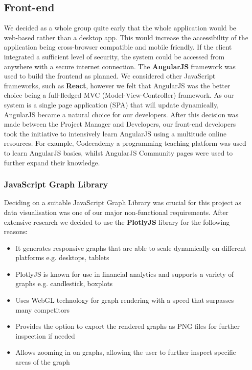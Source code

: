 \documentclass[12pt]{article}
\begin{document}
  \subsection{Front-end}
  We decided as a whole group quite early that the whole application would be web-based rather than a desktop app. This would
  increase the accessibility of the application being cross-browser compatible and mobile friendly. If the client integrated a sufficient
  level of security, the system could be accessed from anywhere with a secure internet connection.\newline
  The \textbf{AngularJS} framework was used to build the frontend as planned. We considered other JavaScript frameworks,
  such as \textbf{React}, however we felt that AngularJS was the better choice being a full-fledged MVC (Model-View-Controller) framework.
  As our system is a single page application (SPA) that will update dynamically, AngularJS became a natural choice for our developers.
  \newline
  After this decision was made between the Project Manager and Developers, our front-end developers took the initiative to intensively learn AngularJS using a multitude online resources.
  For example, Codecademy a programming teaching platform was used to learn AngularJS basics, whilst AngularJS Community pages were used to further expand their knowledge.
  \subsubsection{JavaScript Graph Library}
  Deciding on a suitable JavaScript Graph Library was crucial for this project as data visualisation was one of our major non-functional requirements.
  After extensive research we decided to use the \textbf{PlotlyJS} library for the following reasons:
  \begin{itemize}
    \itemsep0em
    \item It generates responsive graphs that are able to scale dynamically on different platforms e.g. desktops, tablets
    \item PlotlyJS is known for use in financial analytics and supports a variety of graphs e.g. candlestick, boxplots
    \item Uses WebGL technology for graph rendering with a speed that surpasses many competitors
    \item Provides the option to export the rendered graphs as PNG files for further inspection if needed
    \item Allows zooming in on graphs, allowing the user to further inspect specific areas of the graph
  \end{itemize}
\end{document}
